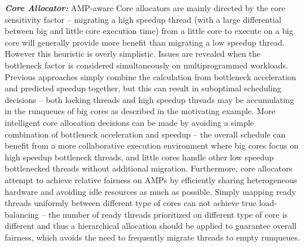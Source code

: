 \textbf{\textit{Core Allocator:}}
AMP-aware Core allocators are mainly directed by the core sensitivity factor -- migrating a high speedup thread (with a large differential between big and little core execution time) from  a little core to execute on a big core will generally provide more benefit than migrating a low speedup thread. 
However this heuristic is overly simplistic. Issues are revealed when the bottleneck factor is considered simultaneously on multiprogrammed workloads. Previous approaches \cite{jibaja2016portable} simply combine the calculation from  bottleneck acceleration and predicted speedup together, but this can result in suboptimal scheduling decisions -- both locking threads and high speedup threads may be accumulating in the runqueues of big cores as described in the motivating example. More intelligent core allocation decisions can be made by avoiding a simple combination of bottleneck acceleration and speedup -- the overall schedule can benefit from a more collaborative execution environment where big cores focus on high speedup bottleneck threads, and little cores handle other low speedup bottlenecked threads without additional migration.
Furthermore, core allocators attempt to achieve relative fairness on AMPs by efficiently sharing heterogeneous hardware and avoiding idle resources as much as possible. 
Simply mapping ready threads uniformly between different type of cores can not achieve true load-balancing -- the number of ready threads prioritized on different type of core is different and thus a hierarchical allocation should be applied to guarantee overall fairness, which avoids the need to frequently migrate threads to empty runqueues. 

